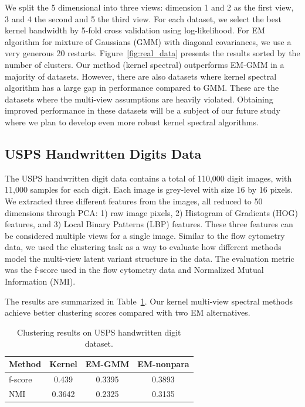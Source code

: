 \documentclass{article}
\begin{document}
We split the 5 dimensional into three views: dimension 1 and 2 as the first view, 3 and 4 the second and 5 the third view. For each dataset, we select the best kernel bandwidth by 5-fold cross validation using log-likelihood. For EM algorithm for mixture of Gaussians (GMM) with diagonal covariances, we use a very generous 20 restarts. Figure~\ref{fig:real_data} presents the results sorted by the number of clusters. Our method (kernel spectral) outperforms EM-GMM in a majority of datasets. However, there are also datasets where kernel spectral algorithm has a large gap in performance compared to GMM. These are the datasets where the multi-view assumptions are heavily violated. Obtaining improved performance in these datasets will be a subject of our future study where we plan to develop even more robust kernel spectral algorithms.

\vspace{-3mm}
\subsection{USPS Handwritten Digits Data}
\vspace{-3mm}
% 
The USPS handwritten digit data contains a total of 110,000 digit images, with 11,000 samples for each digit. Each image is grey-level with size 16 by 16 pixels. We extracted three different features from the images, all reduced to 50 dimensions through PCA: 1) raw image pixels, 2) Histogram of Gradients (HOG) features, and 3) Local Binary Patterns (LBP) features. These three features can be considered multiple views for a single image. Similar to the flow cytometry data, we used the clustering task as a way to evaluate how different methods model the multi-view latent variant structure in the data. The evaluation metric was the f-score used in the flow cytometry data and Normalized Mutual Information (NMI).

The results are summarized in Table~\ref{tbl:usps}. Our kernel multi-view spectral methods achieve better clustering scores compared with two EM alternatives.

\begin{table}
{\centering
\begin{tabular}{l|ccc}
\hline
Method & Kernel & EM-GMM & EM-nonpara \\
\hline
f-score & 0.439 & 0.3395 & 0.3893 \\
\hline
NMI & 0.3642 & 0.2325 & 0.3135 \\
\hline
\end{tabular}
\caption{Clustering results on USPS handwritten digit dataset.}
\label{tbl:usps}}
\end{table}
\end{document}
